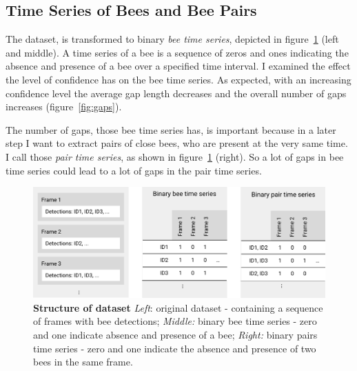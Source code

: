 \subsection{Time Series of Bees and Bee Pairs}
\label{subsec:tracking}

The dataset, is transformed to binary \emph{bee time series}, depicted in figure~\ref{fig:structure} (left and middle). A time series of a bee is a sequence of zeros and ones indicating the absence and presence of a bee over a specified time interval. 
I examined the effect the level of confidence has on the bee time series.
As expected, with an increasing confidence level the average gap length decreases and the overall number of gaps increases (figure~\ref{fig:gaps}).

The number of gaps, those bee time series has, is important because in a later step I want to extract pairs of close bees, who are present at the very same time. I call those \emph{pair time series}, as shown in figure~\ref{fig:structure} (right). So a lot of gaps in bee time series could lead to a lot of gaps in the pair time series.

\begin{figure}[htb]
	\centering
	\includegraphics[width=1.0\textwidth]{Figures/structure}
	\caption[Structure of dataset]{\textbf{Structure of dataset} \emph{Left}: original dataset - containing a sequence of frames with bee detections; \emph{Middle:} binary bee time series - zero and one indicate absence and presence of a bee; \emph{Right:} binary pairs time series - zero and one indicate the absence and presence of two bees in the same frame.}
	\label{fig:structure}
\end{figure}

